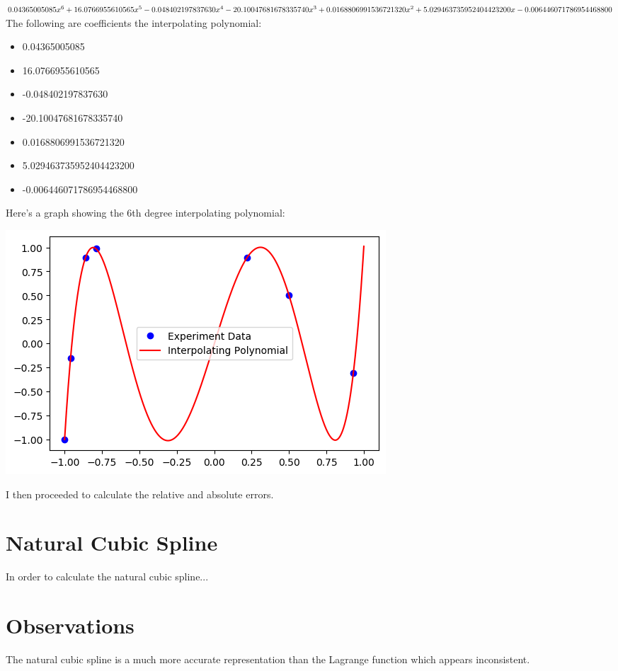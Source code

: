 \documentclass{article}
\begin{document}
$0.04365005085x^6 + 16.0766955610565x^5 - 0.048402197837630x^4 - 20.10047681678335740x^3\\ + 0.0168806991536721320x^2 + 5.029463735952404423200x - 0.006446071786954468800$ \\

The following are coefficients the interpolating polynomial:
 \begin{itemize}
  \item 0.04365005085
  \item 16.0766955610565
  \item -0.048402197837630
  \item -20.10047681678335740
  \item 0.0168806991536721320
  \item 5.029463735952404423200
  \item -0.006446071786954468800
  \end{itemize}

Here's a graph showing the 6th degree interpolating polynomial:

\includegraphics{intpoly}

I then proceeded to calculate the relative and absolute errors.

\section{Natural Cubic Spline}
In order to calculate the natural cubic spline...

\section{Observations}
The natural cubic spline is a much more accurate representation than the Lagrange function which appears inconsistent.  
\end{document}
